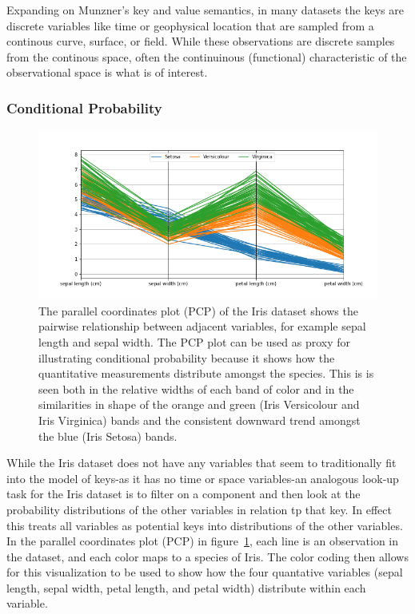 \documentclass[letterpaper,onecolumn,titlepage]{Ythesis}
\begin{document}
Expanding on Munzner's key and value semantics, in many datasets the keys are discrete variables like time or geophysical location that are sampled from a continous curve, surface, or field. While these observations are discrete samples from the continous space, often the continuinous (functional) characteristic\cite{ramsay_functional_2006,muller_functional_2006} of the observational space is what is of interest.

\subsubsection{Conditional Probability}
\begin{figure}
\includegraphics[width=\textwidth]{intro/iris_parallel}
\caption{The parallel coordinates plot (PCP) of the Iris dataset shows the pairwise relationship between adjacent variables, for example sepal length and sepal width. The PCP plot can be used as proxy for illustrating conditional probability because it shows how the quantitative measurements distribute amongst the species. This is is seen both in the relative widths of each band of color and in the similarities in shape of the orange and green (Iris Versicolour and Iris Virginica) bands and the consistent downward trend amongst the blue (Iris Setosa) bands.}
\label{fig:iris_parallel}
\end{figure}

While the Iris dataset does not have any variables that seem to traditionally fit into the model of keys-as it has no time or space variables-an analogous look-up task for the Iris dataset is to filter on a component and then look at the probability distributions of the other variables in relation tp that key. In effect this treats all variables as potential keys into distributions of the other variables. In the parallel coordinates plot (PCP)\cite{claessen_flexible_2011,_nist/sematech_????,inselberg_plane_1985, wegman_hyperdimensional_1990} in figure~\ref{fig:iris_parallel}, each line is an observation in the dataset, and each color maps to a species of Iris. The color coding then allows for this visualization to be used to show how the four quantative variables (sepal length, sepal width, petal length, and petal width) distribute within each variable. 
\end{document}
